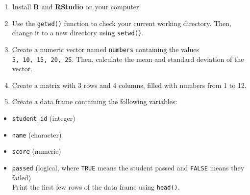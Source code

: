 \documentclass[
  11pt,
]{book}
\providecommand{\tightlist}{%
  \setlength{\itemsep}{0pt}\setlength{\parskip}{0pt}}
\theoremstyle{definition}
\theoremstyle{definition}
\theoremstyle{definition}
\theoremstyle{definition}
\theoremstyle{remark}
\begin{document}
\begin{enumerate}
\def\labelenumi{\arabic{enumi}.}
\tightlist
\item
  Install \textbf{R} and \textbf{RStudio} on your computer.\\
\item
  Use the \texttt{getwd()} function to check your current working directory. Then, change it to a new directory using \texttt{setwd()}.\\
\item
  Create a numeric vector named \texttt{numbers} containing the values \texttt{5,\ 10,\ 15,\ 20,\ 25}. Then, calculate the mean and standard deviation of the vector.\\
\item
  Create a matrix with 3 rows and 4 columns, filled with numbers from 1 to 12.\\
\item
  Create a data frame containing the following variables:\\
\end{enumerate}

\begin{itemize}
\tightlist
\item
  \texttt{student\_id} (integer)\\
\item
  \texttt{name} (character)\\
\item
  \texttt{score} (numeric)\\
\item
  \texttt{passed} (logical, where \texttt{TRUE} means the student passed and \texttt{FALSE} means they failed)\\
  Print the first few rows of the data frame using \texttt{head()}.\\
\end{itemize}
\end{document}
